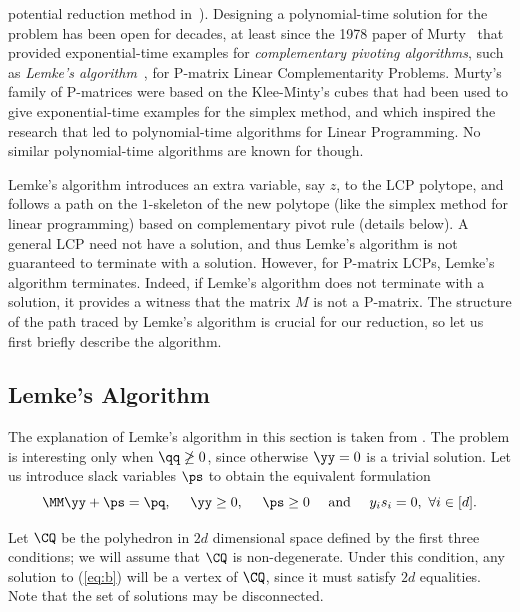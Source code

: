potential reduction method in~\cite{kojima1992interior}).  Designing a
polynomial-time solution for the \PLCP problem has been open for decades, at
least since the 1978 paper of Murty~\cite{murty1978computational} that provided
exponential-time examples for \emph{complementary pivoting algorithms}, such as 
\emph{Lemke's algorithm}~\cite{lemke1965bimatrix}, for
P-matrix Linear Complementarity Problems. Murty's family of P-matrices were
based on the Klee-Minty's cubes that had been used to give exponential-time
examples for the simplex method, and which inspired the research that led to
polynomial-time algorithms for Linear Programming. No similar polynomial-time
algorithms are known for \PLCP though.

Lemke's algorithm introduces an extra variable, say $z$, to the LCP polytope,
and follows a path on the $1$-skeleton of the new polytope (like the simplex 
method for linear programming) based
on complementary pivot rule (details below).  A general LCP need not have a
solution, and thus Lemke's algorithm is not guaranteed to terminate with a
solution.  However, for P-matrix LCPs, Lemke's algorithm terminates.  Indeed, if
Lemke's algorithm does not terminate with a solution, it provides a witness that
the matrix $M$ is not a P-matrix.  The structure of the path traced by Lemke's
algorithm is crucial for our reduction, so let us first briefly describe the
algorithm.

\subsection{Lemke's Algorithm}
\label{sec:lemke}

The explanation of Lemke's algorithm in this section is taken from \cite{}.
The problem is interesting only when $\qq \not \geq 0$, since otherwise $\yy = 0$ is a trivial solution. Let us introduce
slack variables $\ps$ to obtain the equivalent formulation
\begin{equation} \label{eq:b} \MM \yy  + \ps = \pq, \ \ \ \  \yy \geq 0, \ \ \ \ \ps \geq 0 \ \ \ \ \mbox{and} \ \ \ \ y_is_i = 0,\ \forall i\in[d].  \end{equation}

Let $\CQ$ be the polyhedron in $2d$ dimensional space defined by the first three conditions; we will assume that $\CQ$ is
non-degenerate.  Under this condition, any solution to (\ref{eq:b}) will be a vertex of $\CQ$, since it must satisfy $2d$
equalities. Note that the set of solutions may be disconnected.

